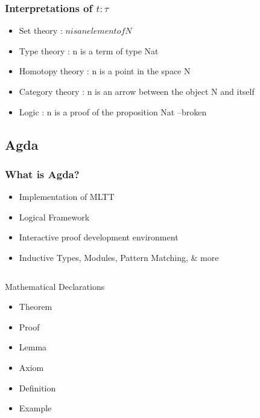 \documentclass[10pt]{beamer}
\begin{document}
\begin{frame}
\frametitle{Interpretations of $t : \tau$}
\begin{itemize}
\item Set theory : $n is an element of N$
\item Type theory : n is a term of type Nat
\item Homotopy theory : n is a point in the space N
\item Category theory : n is an arrow between the object N and itself
\item Logic : n is a proof of the proposition Nat --broken
\end{itemize}
\end{frame}

\subsection{Agda}

\begin{frame}
\frametitle{What is Agda?}

\begin{itemize}
\item Implementation of MLTT
\item Logical Framework
\item Interactive proof development environment
\item Inductive Types, Modules, Pattern Matching, & more
\end{itemize}

\end{frame}

\begin{frame}

\begin{columns}

\begin{column}{0.4 \textwidth}

\begin{block}{Mathematical Declarations}
  \begin{itemize}
    \item Theorem
    \item Proof
    \item Lemma
    \item Axiom
    \item Definition
    \item Example
  \end{itemize}
\end{block}

\end{column}

\begin{column}{0.7 \textwidth}

% 

\end{column}
\end{columns}
\end{frame}
\end{document}
